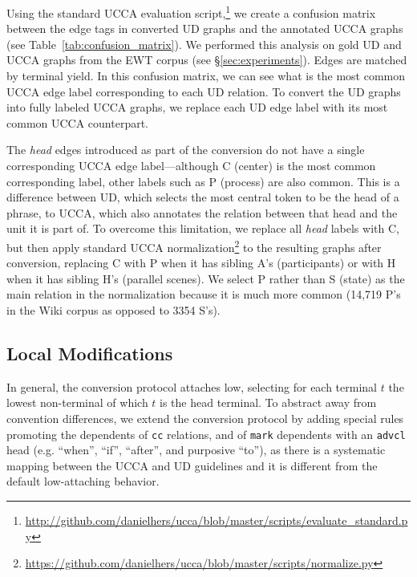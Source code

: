 \documentclass[11pt,a4paper]{article}
\begin{document}
Using the standard UCCA evaluation
script,\footnote{\url{http://github.com/danielhers/ucca/blob/master/scripts/evaluate_standard.py}}
we create a confusion matrix between the edge tags in converted UD graphs
and the annotated UCCA graphs (see Table~\ref{tab:confusion_matrix}).
We performed this analysis on gold UD and UCCA graphs from the EWT corpus (see \S\ref{sec:experiments}).
Edges are matched by terminal yield.
In this confusion matrix, we can see what is the most common UCCA edge label corresponding
to each UD relation.
To convert the UD graphs into fully labeled UCCA graphs,
we replace each UD edge label with its most common UCCA counterpart.

The \textit{head} edges introduced as part of the conversion do not have a single
corresponding UCCA edge label---although C (center) is the most common corresponding label,
other labels such as P (process) are also common.
This is a difference between UD, which selects the most central token to be the head of a phrase,
to UCCA, which also annotates the relation between that head and the unit it is part of.
To overcome this limitation, we replace all \textit{head} labels with C, but then
apply standard UCCA
normalization\footnote{\url{https://github.com/danielhers/ucca/blob/master/scripts/normalize.py}}
to the resulting graphs after conversion,
replacing C with P when it has sibling A's (participants) or
with H when it has sibling H's (parallel scenes).
We select P rather than S (state) as the main relation in the normalization because
it is much more common (14,719 P's in the Wiki corpus as opposed to 3354 S's).

\subsection{Local Modifications}\label{sec:local}

In general, the conversion protocol attaches low,
selecting for each terminal $t$ the lowest non-terminal of which $t$
is the head terminal.
To abstract away from convention differences,
we extend the conversion protocol by adding special rules
promoting the dependents of \verb|cc| relations,
and of \verb|mark| dependents with an \verb|advcl| head
(e.g. ``when'', ``if'', ``after'', and purposive ``to''),
as there is a systematic mapping between the UCCA and UD guidelines
and it is different from the default low-attaching behavior.
\end{document}
